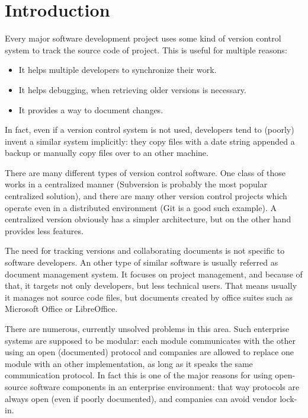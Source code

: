 \section{Introduction}

Every major software development project uses some kind of version control
system to track the source code of project. This is useful for multiple
reasons:

\begin{itemize}
\item It helps multiple developers to synchronize their work.
\item It helps debugging, when retrieving older versions is necessary.
\item It provides a way to document changes.
\end{itemize}

In fact, even if a version control system is not used, developers tend to
(poorly) invent a similar system implicitly: they copy files with a date string
appended a backup or manually copy files over to an other machine.

There are many different types of version control software. One class of those
works in a centralized manner (Subversion\cite{subversion} is probably the most
popular centralized solution), and there are many other version control
projects which operate even in a distributed environment (Git\cite{git} is a
good such example). A centralized version obviously has a simpler architecture,
but on the other hand provides less features.

The need for tracking versions and collaborating documents is not specific to
software developers. An other type of similar software is usually referred as
document management system. It focuses on project management, and because of
that, it targets not only developers, but less technical users. That means
usually it manages not source code files, but documents created by office
suites such as Microsoft Office or LibreOffice.

There are numerous, currently unsolved problems in this area. Such enterprise
systems are supposed to be modular: each module communicates with the other
using an open (documented) protocol and companies are allowed to replace one
module with an other implementation, as long as it speaks the same
communication protocol. In fact this is one of the major reasons for using
open-source software components in an enterprise environment: that way
protocols are always open (even if poorly documented), and companies can avoid
vendor lock-in.

